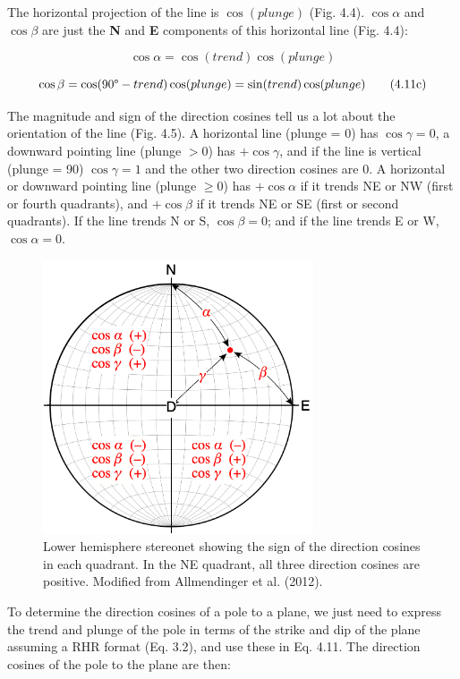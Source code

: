 \documentclass[a4paper , 12pt]{book}
\begin{document}
The horizontal projection of the line is $\cos(plunge)$ (Fig. 4.4). $\cos\alpha$ and $\cos\beta$ are just the \textbf{N} and \textbf{E} components of this horizontal line (Fig. 4.4):

\begin{equation}
    \cos\alpha=\cos(trend)\cos(plunge) \tag{4.11b}
\end{equation}

\begin{equation}
    \cos\beta=\cos(90\degree-trend)\cos(plunge)=\sin(trend)\cos(plunge) \tag{4.11c}
\end{equation}

The magnitude and sign of the direction cosines tell us a lot about the orientation of the line (Fig. 4.5). A horizontal line (plunge = 0) has $\cos\gamma=0$, a downward pointing line (plunge $>0$) has $+\cos\gamma$, and if the line is vertical (plunge = 90\degree) $\cos\gamma=1$ and the other two direction cosines are 0. A horizontal or downward pointing line (plunge $\geq0$) has $+\cos\alpha$ if it trends NE or NW (first or fourth quadrants), and $+\cos\beta$ if it trends NE or SE (first or second quadrants). If the line trends N or S, $\cos\beta=0$; and if the line trends E or W, $\cos\alpha=0$. 

\begin{figure}[ht]
    \centering
    \includegraphics[width=8cm]{Figures/ch4f5.png}
    \caption{Lower hemisphere stereonet showing the sign of the direction cosines in each quadrant. In the NE quadrant, all three direction cosines are positive. Modified from Allmendinger et al. (2012).}
\end{figure}

To determine the direction cosines of a pole to a plane, we just need to express the trend and plunge of the pole in terms of the strike and dip of the plane assuming a RHR format (Eq. 3.2), and use these in Eq. 4.11. The direction cosines of the pole to the plane are then:
\end{document}
